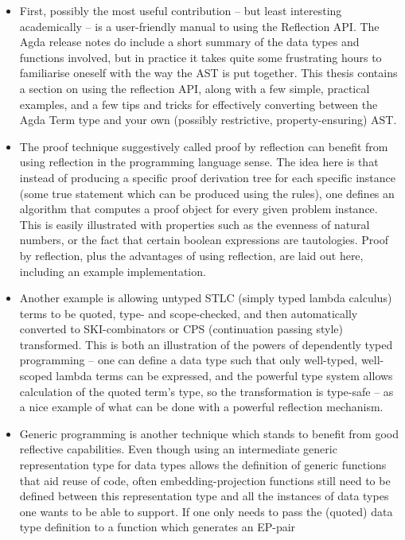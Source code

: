 \documentclass[a4paper]{article}
\begin{document}
\begin{itemize}
  \item First, possibly the most useful contribution -- but least 
interesting academically -- is a user-friendly manual to using the
Reflection API. The Agda release notes\cite{agda-relnotes-228} do
include a short summary of the data types and functions involved, but
in practice it takes quite some frustrating hours to familiarise
oneself with the way the AST is put together. This thesis contains a
section on using the reflection API, along with a few simple,
practical examples, and a few tips and tricks for effectively
converting between the Agda Term type and your own (possibly
restrictive, property-ensuring) AST.
  \item The proof technique suggestively called proof by reflection
can benefit from using reflection in the programming language
sense. The idea here is that instead of producing a specific proof
derivation tree for each specific instance (some true statement which
can be produced using the rules), one defines an algorithm that computes a proof object for every given problem instance. This is easily illustrated
with properties such as the evenness of natural numbers, or the fact
that certain boolean expressions are tautologies. Proof by reflection,
plus the advantages of using reflection, are laid out here, including
an example implementation.
  \item Another example is allowing untyped STLC (simply typed lambda
calculus) terms to be quoted, type- and scope-checked, and then
automatically converted to SKI-combinators or CPS (continuation
passing style) transformed. This is both an illustration of the powers of
dependently typed programming -- one can define a data type such
that only well-typed, well-scoped lambda terms can be expressed, and the 
powerful type system allows calculation of the quoted term's type, so the transformation
is type-safe -- as a
nice example of what can be done with a powerful reflection mechanism.
  \item Generic programming is another technique which stands to
benefit from good reflective capabilities. Even though using an
intermediate generic representation type for data types allows the
definition of generic functions that aid reuse of code, often
embedding-projection functions still need to be defined between this
representation type and all the instances of data types one wants to be
able to support. If one only needs to pass the
(quoted) data type definition to a function which generates an EP-pair

\end{itemize}
\end{document}
